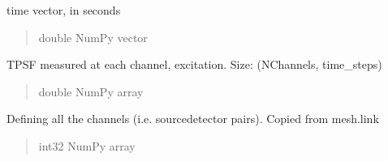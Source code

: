 \documentclass[letterpaper,10pt,english]{sphinxmanual}
\begin{document}
\begin{fulllineitems}
\begin{fulllineitems}
\begin{quote}
\begin{description}
\end{description}\end{quote}

\end{fulllineitems}


\begin{fulllineitems}
\label{\detokenize{_autosummary/nirfasterff.base.data.flTPSFdata:nirfasterff.base.data.flTPSFdata.time}}
\pysigstartsignatures
\pysigline
{}
\pysigstopsignatures
\sphinxAtStartPar
time vector, in seconds
\begin{quote}\begin{description}
\sphinxAtStartPar
double NumPy vector

\end{description}\end{quote}

\end{fulllineitems}


\begin{fulllineitems}
\label{\detokenize{_autosummary/nirfasterff.base.data.flTPSFdata:nirfasterff.base.data.flTPSFdata.tpsfx}}
\pysigstartsignatures
\pysigline
{}
\pysigstopsignatures
\sphinxAtStartPar
TPSF measured at each channel, excitation. Size: (NChannels, time\_steps)
\begin{quote}\begin{description}
\sphinxAtStartPar
double NumPy array

\end{description}\end{quote}

\end{fulllineitems}


\begin{fulllineitems}
\label{\detokenize{_autosummary/nirfasterff.base.data.flTPSFdata:nirfasterff.base.data.flTPSFdata.link}}
\pysigstartsignatures
\pysigline
{}
\pysigstopsignatures
\sphinxAtStartPar
Defining all the channels (i.e. source\sphinxhyphen{}detector pairs). Copied from mesh.link
\begin{quote}\begin{description}
\sphinxAtStartPar
int32 NumPy array


\end{description}
\end{quote}
\end{fulllineitems}
\end{fulllineitems}
\end{document}
